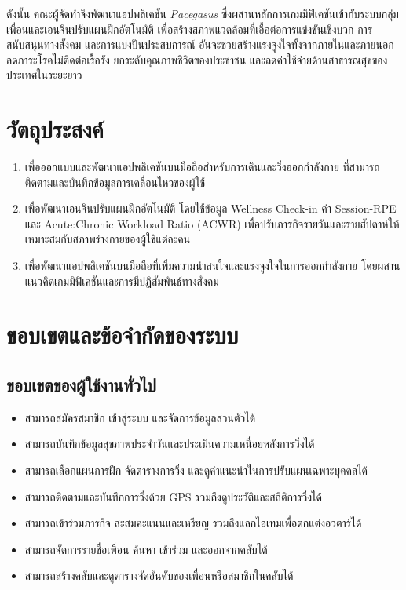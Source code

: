 ดังนั้น คณะผู้จัดทำจึงพัฒนาแอปพลิเคชัน \textit{Pacegasus} ซึ่งผสานหลักการเกมมิฟิเคชันเข้ากับระบบกลุ่มเพื่อนและเอนจินปรับแผนฝึกอัตโนมัติ เพื่อสร้างสภาพแวดล้อมที่เอื้อต่อการแข่งขันเชิงบวก การสนับสนุนทางสังคม และการแบ่งปันประสบการณ์ อันจะช่วยสร้างแรงจูงใจทั้งจากภายในและภายนอก ลดภาระโรคไม่ติดต่อเรื้อรัง ยกระดับคุณภาพชีวิตของประชาชน และลดค่าใช้จ่ายด้านสาธารณสุขของประเทศในระยะยาว

\section{วัตถุประสงค์}

\begin{enumerate}[label=\arabic*)]
    \item เพื่อออกแบบและพัฒนาแอปพลิเคชันบนมือถือสำหรับการเดินและวิ่งออกกำลังกาย ที่สามารถติดตามและบันทึกข้อมูลการเคลื่อนไหวของผู้ใช้
    \item เพื่อพัฒนาเอนจินปรับแผนฝึกอัตโนมัติ โดยใช้ข้อมูล Wellness Check-in ค่า Session-RPE และ Acute:Chronic Workload Ratio (ACWR) เพื่อปรับภารกิจรายวันและรายสัปดาห์ให้เหมาะสมกับสภาพร่างกายของผู้ใช้แต่ละคน
    \item เพื่อพัฒนาแอปพลิเคชันบนมือถือที่เพิ่มความน่าสนใจและแรงจูงใจในการออกกำลังกาย โดยผสานแนวคิดเกมมิฟิเคชันและการมีปฏิสัมพันธ์ทางสังคม
\end{enumerate}

\section{ขอบเขตและข้อจำกัดของระบบ}

\subsection{ขอบเขตของผู้ใช้งานทั่วไป}
\begin{itemize}[label={-}]
    \item สามารถสมัครสมาชิก เข้าสู่ระบบ และจัดการข้อมูลส่วนตัวได้
    \item สามารถบันทึกข้อมูลสุขภาพประจำวันและประเมินความเหนื่อยหลังการวิ่งได้
    \item สามารถเลือกแผนการฝึก จัดตารางการวิ่ง และดูคำแนะนำในการปรับแผนเฉพาะบุคคลได้
    \item สามารถติดตามและบันทึกการวิ่งด้วย GPS รวมถึงดูประวัติและสถิติการวิ่งได้
    \item สามารถเข้าร่วมภารกิจ สะสมคะแนนและเหรียญ รวมถึงแลกไอเทมเพื่อตกแต่งอวตาร์ได้
    \item สามารถจัดการรายชื่อเพื่อน ค้นหา เข้าร่วม และออกจากคลับได้
    \item สามารถสร้างคลับและดูตารางจัดอันดับของเพื่อนหรือสมาชิกในคลับได้
\end{itemize}

